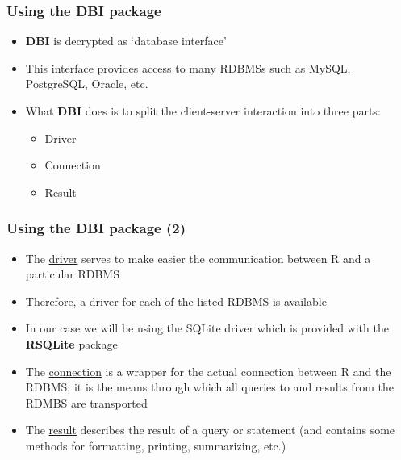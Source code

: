 \documentclass[10pt]{beamer}
\theoremstyle{definition}
\begin{document}
\begin{frame}[fragile]
\frametitle{Using the \textbf{DBI} package}
\begin{itemize}
	\item \textbf{DBI} is decrypted as `database interface'
	\item This interface provides access to many RDBMSs such as MySQL, PostgreSQL, Oracle, etc.
	\item What \textbf{DBI} does is to split the client-server interaction into three parts:
	\begin{itemize}
		\item Driver
		\item Connection
		\item Result
	\end{itemize}
	
\end{itemize}
\end{frame}

\begin{frame}[fragile]
\frametitle{Using the \textbf{DBI} package (2)}
\begin{itemize}
	\item The \underline{driver} serves to make easier the communication between R and a particular RDBMS 
	\item Therefore, a driver for each of the listed RDBMS is available
	\item In our case we will be using the SQLite driver which is provided with the \textbf{RSQLite} package
	\item The \underline{connection} is a wrapper for the actual connection between R and the RDBMS; it is the means through which all queries to and results from the RDMBS are transported
	\item The \underline{result} describes the result of a query or statement (and contains some methods for formatting, printing, summarizing, etc.)
\end{itemize}
\end{frame}
\end{document}
